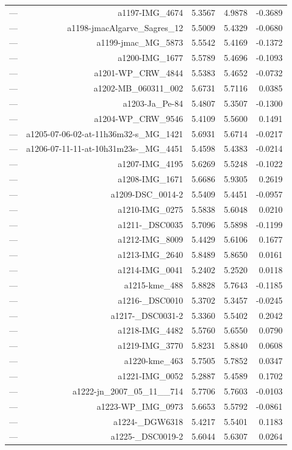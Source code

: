 \begin{table}[htbp]
\begin{tabular}{lrrrr}
— & a1197-IMG_4674 & 5.3567 & 4.9878 & -0.3689 \\
— & a1198-jmacAlgarve_Sagres_12 & 5.5009 & 5.4329 & -0.0680 \\
— & a1199-jmac_MG_5873 & 5.5542 & 5.4169 & -0.1372 \\
— & a1200-IMG_1677 & 5.5789 & 5.4696 & -0.1093 \\
— & a1201-WP_CRW_4844 & 5.5383 & 5.4652 & -0.0732 \\
— & a1202-MB_060311_002 & 5.6731 & 5.7116 & 0.0385 \\
— & a1203-Ja_Pe-84 & 5.4807 & 5.3507 & -0.1300 \\
— & a1204-WP_CRW_9546 & 5.4109 & 5.5600 & 0.1491 \\
— & a1205-07-06-02-at-11h36m32-s_MG_1421 & 5.6931 & 5.6714 & -0.0217 \\
— & a1206-07-11-11-at-10h31m23s-_MG_4451 & 5.4598 & 5.4383 & -0.0214 \\
— & a1207-IMG_4195 & 5.6269 & 5.5248 & -0.1022 \\
— & a1208-IMG_1671 & 5.6686 & 5.9305 & 0.2619 \\
— & a1209-DSC_0014-2 & 5.5409 & 5.4451 & -0.0957 \\
— & a1210-IMG_0275 & 5.5838 & 5.6048 & 0.0210 \\
— & a1211-_DSC0035 & 5.7096 & 5.5898 & -0.1199 \\
— & a1212-IMG_8009 & 5.4429 & 5.6106 & 0.1677 \\
— & a1213-IMG_2640 & 5.8489 & 5.8650 & 0.0161 \\
— & a1214-IMG_0041 & 5.2402 & 5.2520 & 0.0118 \\
— & a1215-kme_488 & 5.8828 & 5.7643 & -0.1185 \\
— & a1216-_DSC0010 & 5.3702 & 5.3457 & -0.0245 \\
— & a1217-_DSC0031-2 & 5.3360 & 5.5402 & 0.2042 \\
— & a1218-IMG_4482 & 5.5760 & 5.6550 & 0.0790 \\
— & a1219-IMG_3770 & 5.8231 & 5.8840 & 0.0608 \\
— & a1220-kme_463 & 5.7505 & 5.7852 & 0.0347 \\
— & a1221-IMG_0052 & 5.2887 & 5.4589 & 0.1702 \\
— & a1222-jn_2007_05_11__714 & 5.7706 & 5.7603 & -0.0103 \\
— & a1223-WP_IMG_0973 & 5.6653 & 5.5792 & -0.0861 \\
— & a1224-_DGW6318 & 5.4217 & 5.5401 & 0.1183 \\
— & a1225-_DSC0019-2 & 5.6044 & 5.6307 & 0.0264 \\

\end{tabular}
\end{table}
